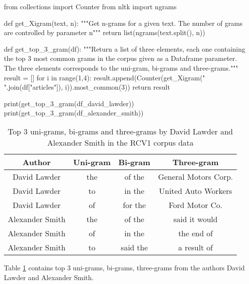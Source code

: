 \begin{lstlisting}[frame=none,caption={Get the top 3 most common grams in the corpus, for uni-grams, bi-grams and three-grams},captionpos=b,label=lst:MostCommonGrams]
\end{lstlisting}
\begin{python}	
	from collections import Counter
	from nltk import ngrams
	
	def get_Xigram(text, n):
		"""Get n-grams for a given text. The number of grams are controlled by parameter n"""
		return list(ngrams(text.split(), n))
	
	def get_top_3_gram(df):
		"""Return a list of three elements, each one containing the top 3 most common grams in the corpus given as a Dataframe parameter. The three elements corresponds to the uni-gram, bi-grams and three-grams."""
		result = []
		for i in range(1,4):
			result.append(Counter(get_Xigram(" ".join(df["articles"]), i)).most_common(3))
		return result
	
	print(get_top_3_gram(df_david_lawder))
	print(get_top_3_gram(df_alexander_smith))	
\end{python}


\begin{table}[h!]
	\begin{center}  
		\caption[Top 3 n-grams in RCV1 corpus]{Top 3 uni-grams, bi-grams and three-grams by David Lawder and Alexander Smith in the RCV1 corpus data} 
		\label{tab:tableNGramsRCV1}
		\begin{tabular}{|c | c | c | c|}
			\hline 
			Author & Uni-gram & Bi-gram & Three-gram \\
			\hline \hline
			David Lawder & the & of the & General Motors Corp. \\ \hline
			David Lawder & to & in the	& United Auto Workers \\ \hline
			David Lawder & of & for the	& Ford Motor Co. \\ \hline
			Alexander Smith & the & of the & said it would \\ \hline
			Alexander Smith & of & in the	& the end of \\ \hline
			Alexander Smith & to & said the	& a result of \\ \hline
		\end{tabular} 
	\end{center}
\end{table}

Table \ref{tab:tableNGramsRCV1} contains top 3 uni-grams, bi-grams, three-grams from the authors David Lawder and Alexander Smith.

